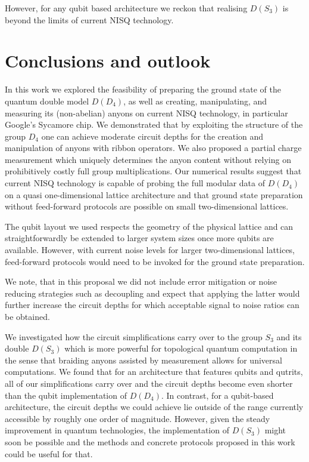 \documentclass[a4paper,twocolumn,11pt, accepted=2024-06-14]{quantumarticle}
\begin{document}
However, for any qubit based architecture we reckon that realising $D(S_3)$ is beyond the limits of current NISQ technology.


\section{Conclusions and outlook} \label{sec:outlook}
In this work we explored the feasibility of preparing the ground state of the quantum double model $D(D_4)$, as well as creating, manipulating, and measuring its (non-abelian) anyons on current NISQ technology, in particular Google's Sycamore chip. We demonstrated that by exploiting the structure of the group $D_4$ one can achieve moderate circuit depths for the creation and manipulation of anyons with ribbon operators. We also proposed a partial charge measurement which uniquely determines the anyon content without relying on prohibitively costly full group multiplications. Our numerical results suggest that current NISQ technology is capable of probing the full modular data of $D(D_4)$ on a quasi one-dimensional lattice architecture and that ground state preparation without feed-forward protocols are possible on small two-dimensional lattices. 


The qubit layout we used respects the geometry of the physical lattice and can straightforwardly be extended to larger system sizes once more qubits are available. However, with current noise levels for larger two-dimensional lattices, feed-forward protocols would need to be invoked for the ground state preparation. 


We note, that in this proposal we did not include error mitigation or noise reducing strategies such as decoupling and expect that applying the latter would further increase the circuit depths for which acceptable signal to noise ratios can be obtained.


We investigated how the circuit simplifications carry over to the group $S_3$ and its double $D(S_3)$ which is more powerful for topological quantum computation in the sense that braiding anyons assisted by measurement allows for universal computations.
We found that for an architecture that features qubits and qutrits, all of our simplifications carry over and the circuit depths become even shorter than the qubit implementation of $D(D_4)$. In contrast, for a qubit-based architecture, the circuit depths we could achieve lie outside of the range currently accessible by roughly one order of magnitude. However, given the steady improvement in quantum technologies, the implementation of $D(S_3)$ might soon be possible and the methods and concrete protocols proposed in this work could be useful for that.
\end{document}
